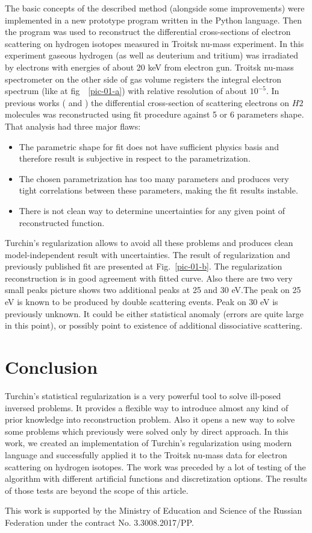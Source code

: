\documentclass{webofc}
\begin{document}
The basic concepts of the described method (alongside some improvements) were implemented in a new prototype program written in the Python language. Then the program was used to reconstruct the differential cross-sections of electron scattering on hydrogen isotopes measured in Troitsk nu-mass experiment. In this experiment gaseous hydrogen (as well as deuterium and tritium)  was irradiated by electrons with energies of about 20 keV from electron gun. Troitsk nu-mass spectrometer on the other side of gas volume registers the integral electron spectrum (like at fig~~\ref{pic-01-a}) with relative resolution of about $10^{-5}$. In previous works (\cite{Aseev2000} and \cite{Abdurashitov:2016nrv}) the differential cross-section of scattering electrons on $H2$ molecules was reconstructed using fit procedure against 5 or 6 parameters shape. That analysis had three major flaws:
\begin{itemize}
\item The parametric shape for fit does not have sufficient physics basis and therefore result is subjective in respect to the parametrization.
\item The chosen parametrization has too many parameters and produces very tight correlations between these parameters, making the fit results instable.
\item There is not clean way to determine uncertainties for any given point of reconstructed function.
\end{itemize}

Turchin's regularization allows to avoid all these problems and produces clean model-independent result with uncertainties. The result of regularization and previously published fit are presented at Fig.~\ref{pic-01-b}. The regularization reconstruction is in good agreement with fitted curve. Also there are two very small peaks picture shows two additional peaks at 25 and 30 eV.The peak on 25 eV is known to be produced by double scattering events. Peak on 30 eV is previously unknown. It could be either statistical anomaly (errors are quite large in this point), or possibly point to existence of additional dissociative scattering.

\section{Conclusion}

Turchin's statistical regularization is a very powerful tool to solve ill-posed inversed problems. It provides a flexible way to introduce almost any kind of prior knowledge into reconstruction problem. Also it opens a new way to solve some problems which previously were solved only by direct approach.
In this work, we created an implementation of Turchin's regularization using modern language and successfully applied it to the Troitsk nu-mass data for electron scattering on hydrogen isotopes. The work was preceded by a lot of testing of the algorithm with different artificial functions and discretization options. The results of those tests are beyond the scope of this article.

This work is supported by the Ministry of Education and Science of the Russian Federation under the contract No. 3.3008.2017/PP.

    
{}        
 
\end{document}
